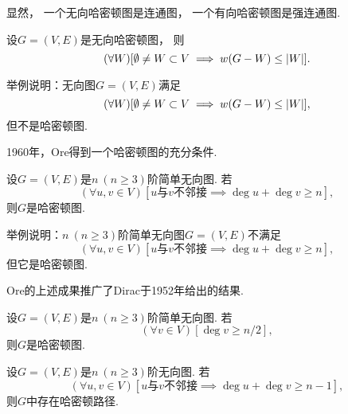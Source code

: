 显然，
一个无向哈密顿图是连通图，
一个有向哈密顿图是强连通图.

\begin{theorem}
设\(G = (V,E)\)是无向哈密顿图，
则\begin{equation*}
	(\forall W)
	[
		\emptyset \neq W \subset V
		\implies
		w(G-W) \leq \abs{W}
	].
\end{equation*}
\end{theorem}

\begin{example}
举例说明：无向图\(G = (V,E)\)满足\begin{equation*}
	(\forall W)
	[
		\emptyset \neq W \subset V
		\implies
		w(G-W) \leq \abs{W}
	],
\end{equation*}
但不是哈密顿图.
\end{example}

1960年，Ore得到一个哈密顿图的充分条件.
\begin{theorem}
设\(G = (V,E)\)是\(n\ (n\geq3)\)阶简单无向图.
若\begin{equation*}
	(\forall u,v \in V)
	\left[
		\text{$u$与$v$不邻接}
		\implies
		\deg u + \deg v \geq n
	\right],
\end{equation*}
则\(G\)是哈密顿图.
\end{theorem}

\begin{example}
举例说明：\(n\ (n\geq3)\)阶简单无向图\(G = (V,E)\)不满足\begin{equation*}
	(\forall u,v \in V)
	\left[
		\text{$u$与$v$不邻接}
		\implies
		\deg u + \deg v \geq n
	\right],
\end{equation*}
但它是哈密顿图.
\end{example}

Ore的上述成果推广了Dirac于1952年给出的结果.
\begin{corollary}
设\(G = (V,E)\)是\(n\ (n\geq3)\)阶简单无向图.
若\begin{equation*}
	(\forall v \in V)
	[\deg v \geq n/2],
\end{equation*}
则\(G\)是哈密顿图.
\end{corollary}

\begin{theorem}
设\(G = (V,E)\)是\(n\ (n\geq3)\)阶无向图.
若\begin{equation*}
	(\forall u,v \in V)
	\left[
		\text{$u$与$v$不邻接}
		\implies
		\deg u + \deg v \geq n-1
	\right],
\end{equation*}
则\(G\)中存在哈密顿路径.
\end{theorem}

